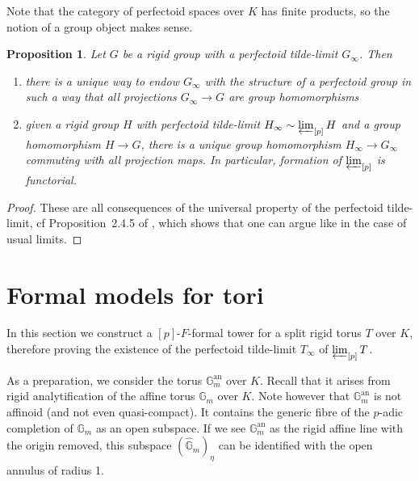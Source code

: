 \documentclass[10pt,oneside]{amsart}
\newtheorem{proposition}[theorem]{Proposition}
\theoremstyle{definition}
\begin{document}
			Note that the category of perfectoid spaces over $K$ has finite products, so the notion of a group object makes sense. 
	
	\begin{proposition}\label{perfectoid tilde limit is perfectoid group in a functorial way}
		Let $G$ be a rigid group with a perfectoid tilde-limit $G_\infty$. Then
		\begin{enumerate}
		\item  there is a unique way to endow $G_\infty$ with the structure of a perfectoid group in such a way that all projections $G_\infty\rightarrow G$ are group homomorphisms
		\item given a rigid group $H$ with perfectoid tilde-limit $H_\infty\sim\varprojlim_{[p]}H$ and a group homomorphism $H\rightarrow G$, there is a unique group homomorphism $H_\infty\rightarrow G_\infty$
		commuting with all projection maps. In particular, formation of $\varprojlim_{[p]}$ is functorial.
	\end{enumerate}
	\end{proposition}
	\begin{proof}
		These are all consequences of the universal property of the perfectoid tilde-limit, cf Proposition~2.4.5 of \cite{SW}, which shows that one can argue like in the case of usual limits.
	\end{proof}

 
	\section{Formal models for tori}
	 
	In this section we construct a $[p]$-$F$-formal tower for a split rigid torus $T$ over $K$, therefore proving the existence of the perfectoid tilde-limit $T_\infty$ of $\varprojlim_{[p]} T$. 
	
	As a preparation, we consider the torus $\mathbb G_m^{\operatorname{an}}$ over $K$. Recall that it arises from rigid analytification of the affine torus $\mathbb G_m$ over $K$. Note however that $\mathbb G_m^{\operatorname{an}}$ is not affinoid (and not even quasi-compact). It contains the generic fibre of the $p$-adic completion of $\mathbb G_m$ as an open subspace. If we see $\mathbb G_m^{\operatorname{an}}$ as the rigid affine line with the origin removed, this subspace $(\widehat{\mathbb G}_m)_{\eta}$ can be identified with the open annulus of radius 1. %
	
\end{document}
